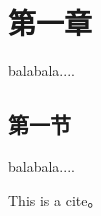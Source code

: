 \documentclass{source/Paper}
\date{\today}
\begin{document}
    \makeheader
    \section{第一章}
    balabala....

    \subsection{第一节}
    balabala....
    
    This is a cite\cite{cheng2019ekiden}。
    
    
    \newpage
    
    
\end{document}
